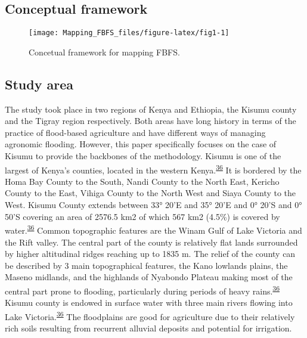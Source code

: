 \documentclass[12pt,oneside]{article}
\begin{document}
\hypertarget{conceptual-framework}{%
\subsection{Conceptual framework}\label{conceptual-framework}}

\begin{figure}[!htbp]

{\centering \texttt{[image: Mapping\_FBFS\_files/figure-latex/fig1-1]} 

}

\caption{Concetual framework for mapping FBFS.}\label{fig:fig1}
\end{figure}

\hypertarget{I1}{%
\subsection{Study area}\label{I1}}

The study took place in two regions of Kenya and Ethiopia, the Kisumu county and the Tigray region respectively. Both areas have long history in terms of the practice of flood-based agriculture and have different ways of managing agronomic flooding. However, this paper specifically focuses on the case of Kisumu to provide the backbones of the methodology. Kisumu is one of the largest of Kenya's counties, located in the western Kenya.\textsuperscript{\protect\hyperlink{ref-KisumuCountyGovernment_2013}{36}} It is bordered by the Homa Bay County to the South, Nandi County to the North East, Kericho County to the East, Vihiga County to the North West and Siaya County to the West. Kisumu County extends between 33° 20'E and 35° 20'E and 0° 20'S and 0° 50'S covering an area of 2576.5 km2 of which 567 km2 (4.5\%) is covered by water.\textsuperscript{\protect\hyperlink{ref-KisumuCountyGovernment_2013}{36}} Common topographic features are the Winam Gulf of Lake Victoria and the Rift valley. The central part of the county is relatively flat lands surrounded by higher altitudinal ridges reaching up to 1835 m. The relief of the county can be described by 3 main topographical features, the Kano lowlands plains, the Maseno midlands, and the highlands of Nyabondo Plateau making most of the central part prone to flooding, particularly during periods of heavy rains.\textsuperscript{\protect\hyperlink{ref-KisumuCountyGovernment_2013}{36}} Kisumu county is endowed in surface water with three main rivers flowing into Lake Victoria.\textsuperscript{\protect\hyperlink{ref-KisumuCountyGovernment_2013}{36}} The floodplains are good for agriculture due to their relatively rich soils resulting from recurrent alluvial deposits and potential for irrigation.
\end{document}
